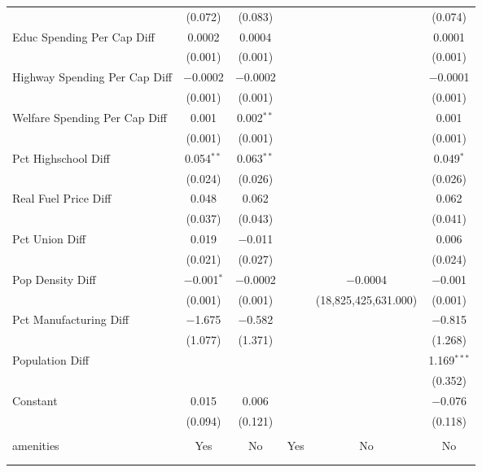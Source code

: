 \begin{table}[!htbp]
\begin{tabular}{@{\extracolsep{5pt}}lccccc}
  & (0.072) & (0.083) &  &  & (0.074) \\ 
  Educ Spending Per Cap Diff & 0.0002 & 0.0004 &  &  & 0.0001 \\ 
  & (0.001) & (0.001) &  &  & (0.001) \\ 
  Highway Spending Per Cap Diff & $-$0.0002 & $-$0.0002 &  &  & $-$0.0001 \\ 
  & (0.001) & (0.001) &  &  & (0.001) \\ 
  Welfare Spending Per Cap Diff & 0.001 & 0.002$^{**}$ &  &  & 0.001 \\ 
  & (0.001) & (0.001) &  &  & (0.001) \\ 
  Pct Highschool Diff & 0.054$^{**}$ & 0.063$^{**}$ &  &  & 0.049$^{*}$ \\ 
  & (0.024) & (0.026) &  &  & (0.026) \\ 
  Real Fuel Price Diff & 0.048 & 0.062 &  &  & 0.062 \\ 
  & (0.037) & (0.043) &  &  & (0.041) \\ 
  Pct Union Diff & 0.019 & $-$0.011 &  &  & 0.006 \\ 
  & (0.021) & (0.027) &  &  & (0.024) \\ 
  Pop Density Diff & $-$0.001$^{*}$ & $-$0.0002 &  & $-$0.0004 & $-$0.001 \\ 
  & (0.001) & (0.001) &  & (18,825,425,631.000) & (0.001) \\ 
  Pct Manufacturing Diff & $-$1.675 & $-$0.582 &  &  & $-$0.815 \\ 
  & (1.077) & (1.371) &  &  & (1.268) \\ 
  Population Diff &  &  &  &  & 1.169$^{***}$ \\ 
  &  &  &  &  & (0.352) \\ 
  Constant & 0.015 & 0.006 &  &  & $-$0.076 \\ 
  & (0.094) & (0.121) &  &  & (0.118) \\ 
 \hline \\[-1.8ex] 
amenities & Yes & No & Yes & No & No \\ 
\hline \\[-1.8ex] 
\hline 
\hline \\[-1.8ex] 
\end{tabular} 
\end{table} 
